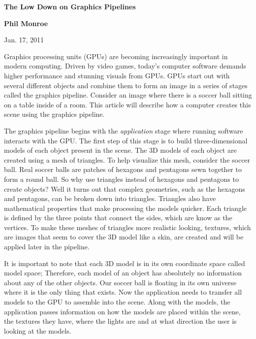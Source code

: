 \documentclass[12pt] {article}
\begin{document}

\centerline{\Large \bf The Low Down on Graphics Pipelines}

\centerline{\bf Phil Monroe}

\centerline{Jan. 17, 2011}
\bigskip


Graphics processing units (GPUs) are becoming increasingly important in modern computing. Driven by video games, today's computer software demands higher performance and stunning visuals from GPUs. GPUs start out with several different objects and combine them to form an image in a series of stages called the graphics pipeline. Consider an image where there is a soccer ball sitting on a table inside of a room. This article will describe how a computer creates this scene using the graphics pipeline.

The graphics pipeline begins with the \emph{application} stage where running software interacts with the GPU. The first step of this stage is to build three-dimensional models of each object present in the scene. The 3D models of each object are created using a mesh of triangles. To help visualize this mesh, consider the soccer ball. Real soccer balls are patches of hexagons and pentagons sewn together to form a round ball. So why use triangles instead of hexagons and pentagons to create objects? Well it turns out that complex geometries, such as the hexagons and pentagons, can be broken down into triangles. Triangles also have mathematical properties that make processing the models quicker. Each triangle is defined by the three points that connect the sides, which are know as the vertices. To make these meshes of triangles more realistic looking, textures, which are images that seem to cover the 3D model like a skin, are created and will be applied later in the pipeline.

It is important to note that each 3D model is in its own coordinate space called model space; Therefore, each model of an object has absolutely no information about any of the other objects. Our soccer ball is floating in its own universe where it is the only thing that exists. Now the application needs to transfer all models to the GPU to assemble into the scene. Along with the models, the application passes information on how the models are placed within the scene, the textures they have, where the lights are and at what direction the user is looking at the models.
\end{document}
